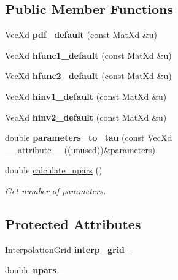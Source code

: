 \subsection*{Public Member Functions}
\begin{DoxyCompactItemize}
\item 
\mbox{\label{class_kernel_bicop_aa5c384abe680e15e68ee753ba07383b9}} 
Vec\+Xd {\bfseries pdf\+\_\+default} (const Mat\+Xd \&u)
\item 
\mbox{\label{class_kernel_bicop_a813b02c149cdfdecd19f7d75b48a5750}} 
Vec\+Xd {\bfseries hfunc1\+\_\+default} (const Mat\+Xd \&u)
\item 
\mbox{\label{class_kernel_bicop_a50d6ee40f8ad1cacf26207aeca593ce7}} 
Vec\+Xd {\bfseries hfunc2\+\_\+default} (const Mat\+Xd \&u)
\item 
\mbox{\label{class_kernel_bicop_aef4490ec07370b9d94da42ffc66472bb}} 
Vec\+Xd {\bfseries hinv1\+\_\+default} (const Mat\+Xd \&u)
\item 
\mbox{\label{class_kernel_bicop_aaa8f2330ce0be70f2963ad2c9fbe3bc9}} 
Vec\+Xd {\bfseries hinv2\+\_\+default} (const Mat\+Xd \&u)
\item 
\mbox{\label{class_kernel_bicop_a1811e79248d178b2e4312e37b337b370}} 
double {\bfseries parameters\+\_\+to\+\_\+tau} (const Vec\+Xd \+\_\+\+\_\+attribute\+\_\+\+\_\+((unused))\&parameters)
\item 
\mbox{\label{class_kernel_bicop_a631fd1cf2a05f30353ed9048839fae85}} 
double \hyperlink{class_kernel_bicop_a631fd1cf2a05f30353ed9048839fae85}{calculate\+\_\+npars} ()
\begin{DoxyCompactList}\small\item\em Get number of parameters. \end{DoxyCompactList}\end{DoxyCompactItemize}
\subsection*{Protected Attributes}
\begin{DoxyCompactItemize}
\item 
\mbox{\label{class_kernel_bicop_a38c072985270dd91e2424d4453ee94a0}} 
\hyperlink{class_interpolation_grid}{Interpolation\+Grid} {\bfseries interp\+\_\+grid\+\_\+}
\item 
\mbox{\label{class_kernel_bicop_aab4f58d0b48ffba37fc617ba7ea9de56}} 
double {\bfseries npars\+\_\+}
\end{DoxyCompactItemize}
